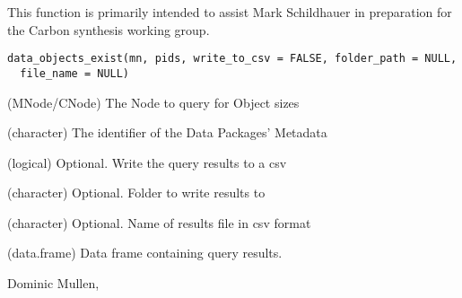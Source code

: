 \documentclass[letterpaper]{book}
\begin{document}
%
\begin{Examples}
\end{Examples}
%
\begin{Description}\relax
This function is primarily intended to assist Mark Schildhauer in preparation
for the Carbon synthesis working group.
\end{Description}
%
\begin{Usage}
\begin{verbatim}
data_objects_exist(mn, pids, write_to_csv = FALSE, folder_path = NULL,
  file_name = NULL)
\end{verbatim}
\end{Usage}
%
\begin{Arguments}
\begin{ldescription}
\item[\code{mn}] (MNode/CNode) The Node to query for Object sizes

\item[\code{pids}] (character) The identifier of the Data Packages' Metadata

\item[\code{write\_to\_csv}] (logical) Optional. Write the query results to a csv

\item[\code{folder\_path}] (character) Optional. Folder to write results to

\item[\code{file\_name}] (character) Optional. Name of results file in csv format
\end{ldescription}
\end{Arguments}
%
\begin{Value}
(data.frame) Data frame containing query results.
\end{Value}
%
\begin{Author}\relax
Dominic Mullen, 
\end{Author}
\end{document}
